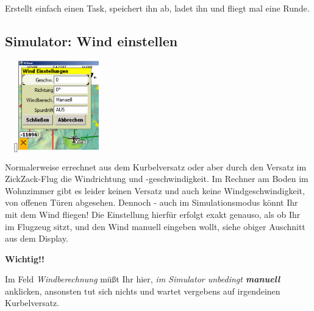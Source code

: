 Erstellt einfach einen Task, speichert ihn ab, ladet ihn und fliegt mal eine Runde.
\subsection{Simulator: Wind einstellen}\label{SimuWind}
\begin{center}\bblitz
{}\blink~\blink~\raisebox{-1.5cm}[]{\includegraphics[width=3.5cm]{Bilder/WindEinstellungen.png}}\\[0.3em]
\end{center}
Normalerweise errechnet \xc aus dem Kurbelversatz oder aber durch den Versatz  im ZickZack-Flug die Windrichtung und -geschwindigkeit.  Im Rechner am Boden im Wohnzimmer gibt es leider keinen Versatz und auch keine Windgeschwindigkeit, von offenen Türen abgesehen. Dennoch - auch im Simulationsmodus könnt Ihr mit dem Wind fliegen! Die Einstellung hierfür erfolgt exakt genauso, als ob Ihr im Flugzeug sitzt, und den Wind manuell eingeben wollt, siehe obiger Auschnitt aus dem Display.
\begin{center}  \textbf{Wichtig!!}  \end{center}
Im Feld \textsl{Windberechnung} müßt Ihr hier, \textsl{im Simulator unbedingt \textbf{manuell}} anklicken, ansonsten tut sich nichts und \xc wartet vergebens auf irgendeinen Kurbelversatz.


